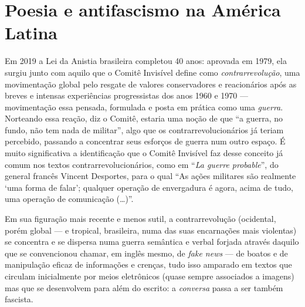 \chapter[Poesia e antifascismo na América Latina]{Poesia e antifascismo na América Latina }


Em 2019 a Lei da Anistia brasileira completou 40 anos: aprovada em 1979,
ela surgiu junto com aquilo que o Comitê Invisível define como
\emph{contrarrevolução}, uma movimentação global pelo resgate de valores
conservadores e reacionários após as breves e intensas experiências
progressistas dos anos 1960 e 1970 --- movimentação essa pensada, formulada e
posta em prática como uma \emph{guerra}. Norteando essa reação, diz o
Comitê, estaria uma noção de que ``a guerra, no fundo, não tem nada de
militar'', algo que os contrarrevolucionários já teriam percebido,
passando a concentrar seus esforços de guerra num outro espaço. É muito
significativa a identificação que o Comitê Invisível faz desse conceito
já comum nos textos contrarrevolucionários, como em ``\emph{La guerre
probable}'', do general francês Vincent Desportes, para o qual ``As ações
militares são realmente `uma forma de falar'; qualquer operação de
envergadura é agora, acima de tudo, uma operação de comunicação (\ldots{})''.

\asterisc

Em sua figuração mais recente e menos sutil, a contrarrevolução
(ocidental, porém global --- e tropical, brasileira, numa das suas
encarnações mais violentas) se concentra e se dispersa numa guerra
semântica e verbal forjada através daquilo que se convencionou chamar,
em inglês mesmo, de \emph{fake news} --- de boatos e de manipulação eficaz
de informações e crenças, tudo isso amparado em textos que circulam
inicialmente por meios eletrônicos (quase sempre associados a imagens)
mas que se desenvolvem para além do escrito: a \emph{conversa} passa a
ser também fascista.

\asterisc

